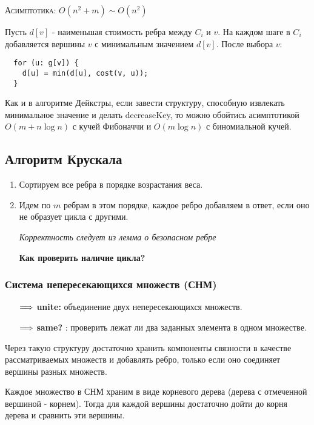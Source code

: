 \textsc{Асимптотика: $O(n^2 + m) \sim O(n^2)$}

Пусть $d[v]$ - наименьшая стоимость ребра между $C_i$ и $v$. На каждом шаге в $C_i$ добавляется вершины $v$ с минимальным значением $d[v]$. После выбора $v$:
\begin{verbatim}
  for (u: g[v]) {
    d[u] = min(d[u], cost(v, u));
  }
\end{verbatim}

\begin{note}
Как и в алгоритме Дейкстры, если завести структуру, способную извлекать минимальное значение и делать decreaseKey, то можно обойтись асимптотикой $O(m + n\log{n})$ с кучей Фибоначчи и $O(m \log{n})$ с биномиальной кучей.
\end{note}
\subsection{Алгоритм Крускала}
\begin{enumerate}
  \item Сортируем все ребра в порядке возрастания веса. 
  \item Идем по $m$ ребрам в этом порядке, каждое ребро добавляем в ответ, если оно не образует цикла с другими.
  
  \noindent
  \textit{Корректность следует из лемма о безопасном ребре}

  \textbf{Как проверить наличие цикла?}
\end{enumerate}

\subsubsection{Система непересекающихся множеств (СНМ)}
\begin{enumerate}
  \item[$\Longrightarrow$] \textbf{unite:} объединение двух непересекающихся множеств.
  \item[$\Longrightarrow$] \textbf{same?} : проверить лежат ли два заданных элемента в одном множестве. 
\end{enumerate}

Через такую структуру достаточно хранить компоненты связности в качестве рассматриваемых множеств и добавлять ребро, только если оно соединяет вершины разных множеств.

Каждое множество в СНМ храним в виде корневого дерева (дерева с отмеченной вершиной - корнем). Тогда для каждой вершины достаточно дойти до корня дерева и сравнить эти вершины. 


